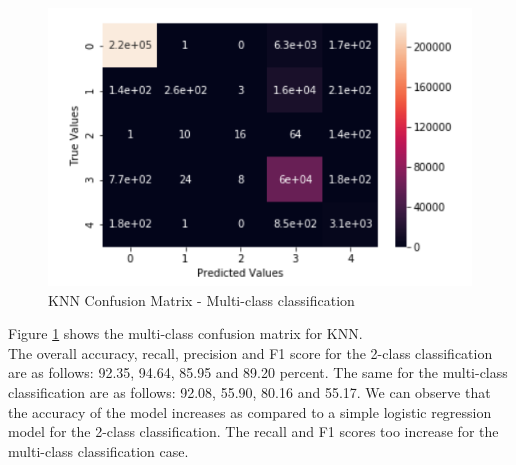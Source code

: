 \begin{figure}
	\includegraphics[width=1.0\columnwidth]{images/knnall.PNG}
	\caption{KNN Confusion Matrix - Multi-class classification}
	\label{F:knnall}
\end{figure}
Figure \ref{F:knnall} shows the multi-class confusion matrix for KNN.\\
The overall accuracy, recall, precision and F1 score for the 2-class classification are as follows: 92.35, 94.64, 85.95 and 89.20 percent. The same for the multi-class classification are as follows: 92.08, 55.90, 80.16
and 55.17. We can observe that the accuracy of the model increases as compared to a simple logistic regression model for the 2-class classification. The recall and F1 scores too increase for the multi-class classification case.


